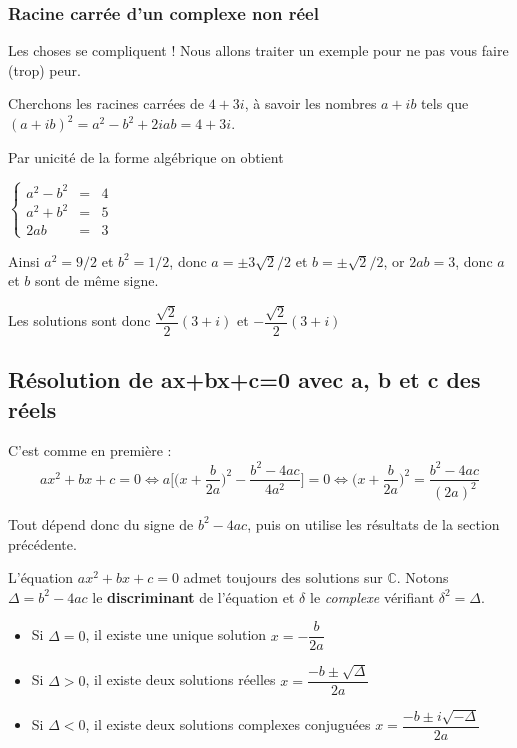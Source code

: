 \documentclass[french]{book}
\newcommand{\bbc}{\mathbb {C}}
\newcommand{\bsyc}{\left\{\begin{array}{rcl}} %
\newcommand{\esyc}{\end{array}\right.}
\newcommand{\fr}[2]{\dfrac{#1}{#2}}
\newcommand{\ssi}{\Longleftrightarrow}
\newcommand{\cacher}[1]{#1}
\newcommand{\cacheg}[1]{#1}
\begin{document}
\subsubsection{Racine carrée d'un complexe non réel}

Les choses se  compliquent ! Nous allons traiter un  exemple pour ne pas
vous faire (trop) peur.  


  \begin{exemple}[]
    
Cherchons les racines carrées de $4+3i$, à savoir les nombres
$a+ib$ tels que $(a+ib)^2=a^2-b^2+2iab=4+3i$. 
    \end{exemple}
  

 Par unicité de la forme algébrique on obtient 

$\bsyc a^2-b^2&=&4\\a^2+b^2&=&5\\2ab&=&3\esyc$

Ainsi $a^2=$\cacher{$9/2$} et $b^2=$\cacher{$1/2$}, donc $a=$\cacher{$\pm3\sqrt{2}/2$} et
$b=$\cacher{$\pm\sqrt{2}/2$}, or $2ab=3$, donc $a$ et $b$ sont \cacher{de même signe}.

Les solutions sont donc \cacher{$\fr{\sqrt{2}}{2}(3+i)$} et
\cacher{$-\fr{\sqrt{2}}{2}(3+i)$}



\subsection{Résolution de ax+bx+c=0 avec a, b   et  c  des réels} 

C'est        comme       en        première      :       \[ax^2+bx+c=0\ssi
a\Big[\big(x+\fr{b}{2a}\big)^2-\fr{b^2-4ac}{4a^2}\Big]=0\ssi
\bigl(x+\fr{b}{2a}\bigr)^2=\fr{b^2-4ac}{(2a)^2}\] 

Tout dépend donc du signe de $b^2-4ac$, puis on utilise les résultats de la section précédente.



  \begin{thm}[Résolution  de \boldmath$ax^2+bx+c=0\quad \text{avec}
    \ a,\ b \ \text{ et }\ c$ \unboldmath des réels] 
    L'équation $ax^2+bx+c=0$ admet toujours des solutions sur $\bbc$. 
Notons  $\Delta=b^2-4ac$  le   \textbf{discriminant}  de  l'équation  et
$\delta$ le \emph{complexe} vérifiant $\delta^2=\Delta$.
\begin{itemize}
\item[$\bullet$] Si $\Delta=0$, il existe une unique solution \cacheg{$x=-\fr{b}{2a}$}
\item[$\bullet$] Si $\Delta>0$, il existe deux solutions réelles  \cacheg{$x=\fr{-b\pm\sqrt{\Delta}}{2a}$}
\item[$\bullet$]  Si  $\Delta<0$, il  existe  deux  solutions complexes  conjuguées
  \cacheg{$x=\fr{-b\pm i\sqrt{-\Delta}}{2a}$} 
\end{itemize}
    \end{thm}
  
\end{document}
